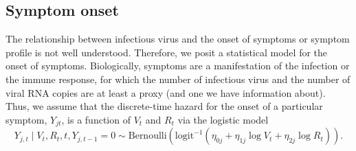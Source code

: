 \documentclass[12pt]{article}
\begin{document}
\subsection{Symptom onset}
The relationship between infectious virus and the onset of symptoms or symptom profile is not well understood. Therefore, we posit a statistical model for the onset of symptoms. Biologically, symptoms are a manifestation of the infection or the immune response, for which the number of infectious virus and the number of viral RNA copies are at least a proxy (and one we have information about). Thus, we assume that the discrete-time hazard for the onset of a particular symptom, $Y_{jt}$, is a function of $V_t$ and $R_t$ via the logistic model
\begin{equation*}
    Y_{j,t} \mid V_t, R_t, t, Y_{j,t-1} = 0 \sim \text{Bernoulli}(\text{logit}^{-1}(\eta_{0j} + \eta_{1j} \log V_t + \eta_{2j} \log R_t)).
\end{equation*}
\end{document}
